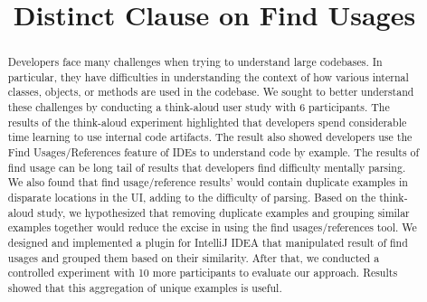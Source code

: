 \documentclass[conference]{IEEEtran}
\begin{document}
\title{Distinct Clause on Find Usages}



\author{
\and
{}
\and
{}
}

\maketitle

\begin{abstract}
Developers face many challenges when trying to understand large codebases. In particular, they have difficulties in understanding the context of how various internal classes, objects, or methods are used in the codebase. We sought to better understand these challenges by conducting a think-aloud user study with 6 participants. The results of the think-aloud experiment highlighted that developers spend considerable time learning to use internal code artifacts. The result also showed developers use the Find Usages/References feature of IDEs to understand code by example. The results of find usage can be long tail of results that developers find difficulty mentally parsing. We also found that find usage/reference results' would contain duplicate examples in disparate locations in the UI, adding to the difficulty of parsing. Based on the think-aloud study, we hypothesized that removing duplicate examples and grouping similar examples together would reduce the excise in using the find usages/references tool. We designed and implemented a plugin for IntelliJ IDEA that manipulated result of find usages and grouped them based on their similarity. After that, we conducted a controlled experiment with 10 more participants to evaluate our approach. Results showed that this aggregation of unique examples is useful.
\end{abstract}
\end{document}

